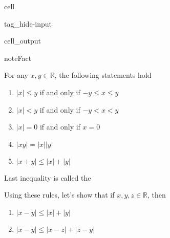 \documentclass[letterpaper,10pt,english]{jupyterBook}
\begin{document}
\begin{sphinxuseclass}{cell}
\begin{sphinxuseclass}{tag_hide-input}\begin{sphinxVerbatimOutput}

\begin{sphinxuseclass}{cell_output}

\end{sphinxuseclass}\end{sphinxVerbatimOutput}

\end{sphinxuseclass}
\end{sphinxuseclass}
\begin{sphinxadmonition}{note}{Fact}

\sphinxAtStartPar
For any \(x, y \in \mathbb{R}\), the following statements hold
\begin{enumerate}
%
\item {} 
\sphinxAtStartPar
\(|x| \leq y\) if and only if \(-y \leq x \leq y\)

\item {} 
\sphinxAtStartPar
\(|x| < y\) if and only if \(-y < x < y\)

\item {} 
\sphinxAtStartPar
\(|x| = 0\) if and only if \(x=0\)

\item {} 
\sphinxAtStartPar
\(|xy| = |x| |y|\)

\item {} 
\sphinxAtStartPar
\(|x+y| \leq |x| + |y|\)

\end{enumerate}

\sphinxAtStartPar
Last inequality is called the 
\end{sphinxadmonition}

\sphinxAtStartPar
Using these rules, let’s show that if \(x, y, z \in \mathbb{R}\), then
\begin{enumerate}
%
\item {} 
\sphinxAtStartPar
\(|x-y| \leq |x| + |y|\)

\item {} 
\sphinxAtStartPar
\(|x-y| \leq |x - z| + |z - y|\)

\end{enumerate}
\end{document}
